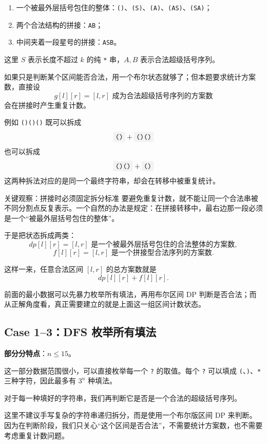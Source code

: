 \documentclass{book}
\newcommand{\code}[1]{\colorbox{codebg}{\texttt{#1}}}  %
\begin{document}
\begin{enumerate}[leftmargin=2em,itemsep=1pt,topsep=2pt,parsep=0pt,partopsep=0pt]
    \item 一个被最外层括号包住的整体：\code{()}、\code{(S)}、\code{(A)}、\code{(AS)}、\code{(SA)}；
    \item 两个合法结构的拼接：\code{AB}；
    \item 中间夹着一段星号的拼接：\code{ASB}。
\end{enumerate}

这里 $S$ 表示长度不超过 $k$ 的纯 \code{*} 串，$A,B$ 表示合法超级括号序列。

如果只是判断某个区间能否合法，用一个布尔状态就够了；但本题要求统计方案数，直接设
\[
g[l][r]=[l,r]\text{ 成为合法超级括号序列的方案数}
\]
会在拼接时产生重复计数。

例如 \code{()()()} 既可以拆成
\[
\code{()}+\code{()()}
\]
也可以拆成
\[
\code{()()}+\code{()}
\]
这两种拆法对应的是同一个最终字符串，却会在转移中被重复统计。

\begin{keybox}{关键观察：拼接时必须固定拆分标准}
要避免重复计数，就不能让同一个合法串被不同分割点反复表示。一个自然的办法是规定：在拼接转移中，最右边那一段必须是一个“被最外层括号包住的整体”。
\end{keybox}

于是把状态拆成两类：
\[
dp[l][r]=[l,r]\text{ 是一个被最外层括号包住的合法整体的方案数},
\]
\[
f[l][r]=[l,r]\text{ 是一个拼接型合法序列的方案数}.
\]

这样一来，任意合法区间 $[l,r]$ 的总方案数就是
\[
dp[l][r]+f[l][r].
\]

前面的最小数据可以先暴力枚举所有填法，再用布尔区间 DP 判断是否合法；而从正解角度看，真正需要建立的就是上面这一组区间计数状态。
\subsection{Case 1--3：DFS 枚举所有填法}

\textbf{部分分特点}：$n\le 15$。

这一部分数据范围很小，可以直接枚举每一个 \code{?} 的取值。每个 \code{?} 可以填成 \code{(}、\code{)}、\code{*} 三种字符，因此最多有 $3^n$ 种填法。

对于每一种填好的字符串，我们再判断它是否是一个合法的超级括号序列。

这里不建议手写复杂的字符串递归拆分，而是使用一个布尔版区间 DP 来判断。因为在判断阶段，我们只关心“这个区间是否合法”，不需要统计方案数，也不需要考虑重复计数问题。
\end{document}

